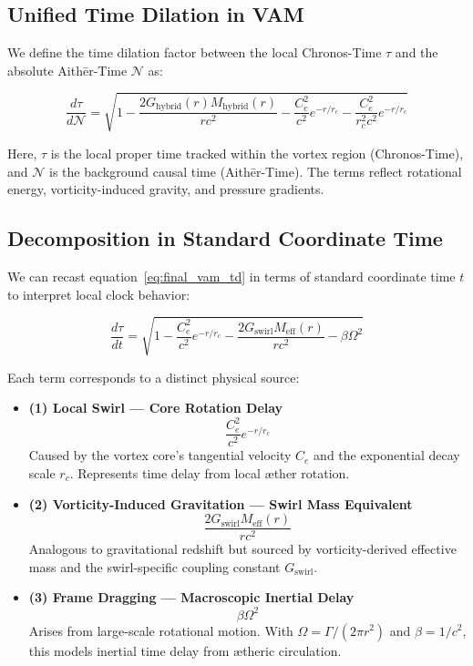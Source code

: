 \documentclass[preprint]{revtex4-2}
\begin{document}
\subsection{Unified Time Dilation in VAM}
We define the time dilation factor between the local Chronos-Time $\tau$ and the absolute Aith\=er-Time $\mathcal{N}$ as:

\begin{equation}
    \boxed{
        \frac{d\tau}{d\mathcal{N}} = \sqrt{
            1
            - \frac{2 G_{\text{hybrid}}(r) M_{\text{hybrid}}(r)}{r c^2}
            - \frac{C_e^2}{c^2} e^{-r/r_c}
            - \frac{C_e^2}{r_c^2 c^2} e^{-r/r_c}
        }}
    \label{eq:final_vam_td}
\end{equation}

Here, $\tau$ is the local proper time tracked within the vortex region (Chronos-Time), and $\mathcal{N}$ is the background causal time (Aith\=er-Time). The terms reflect rotational energy, vorticity-induced gravity, and pressure gradients.

\subsection{Decomposition in Standard Coordinate Time}
We can recast equation~\eqref{eq:final_vam_td} in terms of standard coordinate time $t$ to interpret local clock behavior:

\begin{equation}
    \frac{d\tau}{dt} = \sqrt{
        1
        - \frac{C_e^2}{c^2} e^{-r/r_c}
        - \frac{2 G_\text{swirl} M_\text{eff}(r)}{r c^2}
        - \beta \Omega^2
    }
\end{equation}

Each term corresponds to a distinct physical source:

\begin{itemize}
    \item \textbf{(1) Local Swirl --- Core Rotation Delay}
    \[
        \frac{C_e^2}{c^2} e^{-r/r_c}
    \]
    Caused by the vortex core's tangential velocity $C_e$ and the exponential decay scale $r_c$. Represents time delay from local \ae{}ther rotation.

    \item \textbf{(2) Vorticity-Induced Gravitation --- Swirl Mass Equivalent}
    \[
        \frac{2 G_\text{swirl} M_\text{eff}(r)}{r c^2}
    \]
    Analogous to gravitational redshift but sourced by vorticity-derived effective mass and the swirl-specific coupling constant $G_\text{swirl}$.

    \item \textbf{(3) Frame Dragging --- Macroscopic Inertial Delay}
    \[
        \beta \Omega^2
    \]
    Arises from large-scale rotational motion. With $\Omega = \Gamma / (2\pi r^2)$ and $\beta = 1/c^2$, this models inertial time delay from \ae{}theric circulation.
\end{itemize}
\end{document}

